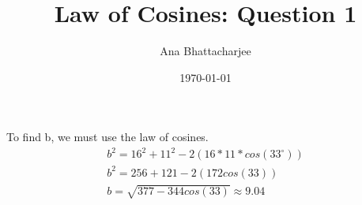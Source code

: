 \documentclass{article}
\begin{document}
\title{Law of Cosines: Question 1}
\author{Ana Bhattacharjee}
\date{\today}
\maketitle{}
\begin{center}
To find b, we must use the law of cosines.
\begin{align}
  b^2 = 16^2 + 11^2 - 2(16*11*cos(33^{\circ})) \\
  b^2 = 256 + 121 - 2(172cos(33)) \\
  b = \sqrt{377 - 344cos(33)} \approx 9.04 
\end{align}
\end{center}
\end{document}
